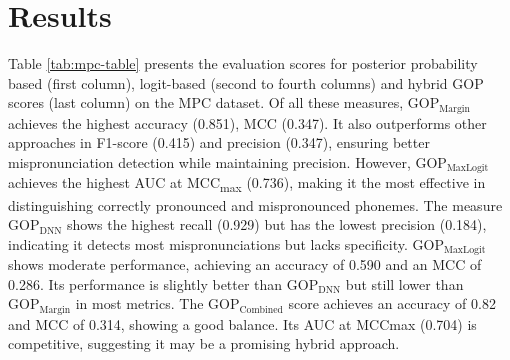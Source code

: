 \documentclass{Interspeech}
\begin{document}
\section{Results}






Table \ref{tab:mpc-table} presents the evaluation scores for posterior probability based (first column), logit-based (second to fourth columns) and hybrid GOP scores (last column) on the MPC dataset. 
Of all these measures, \(\text{GOP}_{\text{Margin}}\) achieves the highest accuracy (0.851), MCC (0.347). It also outperforms other approaches in F1-score (0.415) and precision (0.347), ensuring better mispronunciation detection while maintaining precision. However, \(\text{GOP}_{\text{MaxLogit}}\) achieves the highest AUC at MCC\textsubscript{max} (0.736), making it the most effective in distinguishing correctly pronounced and mispronounced phonemes.  The measure \( \text{GOP}_{\text{DNN}}\) shows the highest recall (0.929) but has the lowest precision (0.184), indicating it detects most mispronunciations but lacks specificity. 
\(\text{GOP}_{\text{MaxLogit}}\) shows moderate performance, achieving an accuracy of 0.590 and an MCC of 0.286.  
Its performance is slightly better than \(\text{GOP}_{\text{DNN}}\) but still lower than \(\text{GOP}_{\text{Margin}}\) in most metrics.  The \(\text{GOP}_{\text{Combined}}\) score achieves an accuracy of 0.82 and MCC of 0.314, showing a good balance.  Its AUC at MCCmax (0.704) is competitive, suggesting it may be a promising hybrid approach.  
\end{document}
